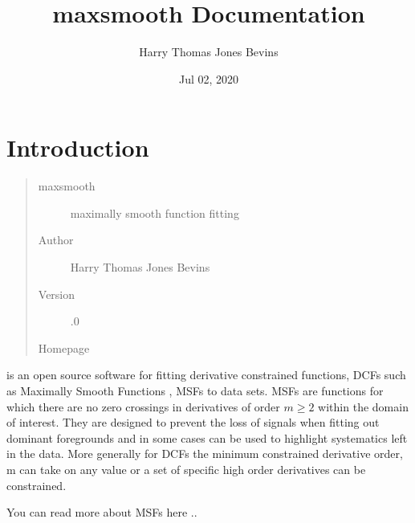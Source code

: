 \documentclass[letterpaper,10pt,english]{sphinxmanual}
\title{maxsmooth Documentation}
\date{Jul 02, 2020}
\author{Harry Thomas Jones Bevins}
\begin{document}
\pagestyle{empty}
\sphinxmaketitle
\pagestyle{plain}
\sphinxtableofcontents
\pagestyle{normal}
\label{\detokenize{source/index::doc}}



\chapter{Introduction}
\label{\detokenize{source/intro:introduction}}\begin{quote}\begin{description}
\item[{maxsmooth}] \leavevmode
maximally smooth function fitting

\item[{Author}] \leavevmode
Harry Thomas Jones Bevins

\item[{Version}] .0

\item[{Homepage}] \leavevmode
{}

\end{description}\end{quote}

 is an open source software for fitting derivative constrained
functions, DCFs such as Maximally Smooth Functions
, MSFs to data sets. MSFs are functions for which there are no zero
crossings in derivatives of order \(m \geq 2\) within the domain of interest.
They are designed to prevent the loss of
signals when fitting out dominant foregrounds and in some cases can be used to
highlight systematics left in the data. More generally for DCFs the minimum
constrained derivative order, m can take on any value or a set of
specific high order derivatives can be constrained.

You can read more about MSFs here ..
\end{document}
